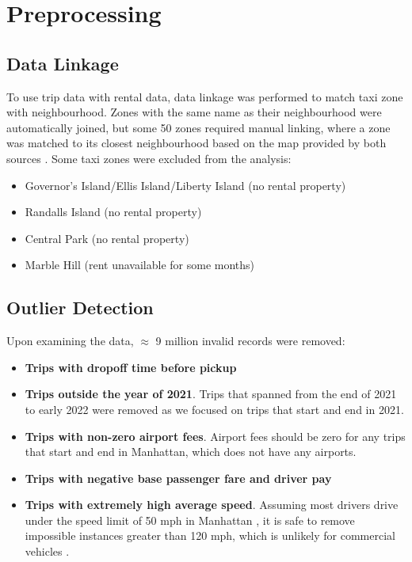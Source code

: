 \documentclass[11pt]{article}
\begin{document}


\section{Preprocessing}

\subsection{Data Linkage}

To use trip data with rental data, data linkage was performed to match taxi zone with neighbourhood. Zones with the same name as their neighbourhood were automatically joined, but some 50 zones required manual linking, where a zone was matched to its closest neighbourhood based on the map provided by both sources \cite{tripdata, rentaldata}. Some taxi zones were excluded from the analysis:
\begin{itemize}
\item Governor's Island/Ellis Island/Liberty Island (no rental property)
\item Randalls Island (no rental property)
\item Central Park (no rental property)
\item Marble Hill (rent unavailable for some months)
\end{itemize}

\subsection{Outlier Detection}
Upon examining the data, $\approx$ 9 million invalid records were removed:  
 
\begin{itemize}
\item \textbf{Trips with dropoff time before pickup}
\end{itemize}
\begin{itemize}
\item \textbf{Trips outside the year of 2021}. Trips that spanned from the end of 2021 to early 2022 were removed as we focused on trips that start and end in 2021.
\item \textbf{Trips with non-zero airport fees}.  Airport fees should be zero for any trips that start and end in Manhattan, which does not have any airports.
\item \textbf{Trips with negative base passenger fare and driver pay}
\item \textbf{Trips with extremely high average speed}. Assuming most drivers drive under the speed limit of 50 mph in Manhattan \cite{speedlimit}, it is safe to remove impossible instances greater than 120 mph, which is unlikely for commercial vehicles \cite{carlimit}.
\end{itemize}
\end{document}
